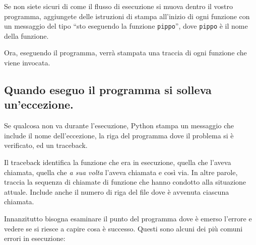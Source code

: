 \documentclass[10pt]{book}
\begin{document}
Se non siete sicuri di come il flusso di esecuzione si muova dentro il vostro programma, aggiungete delle istruzioni di stampa all'inizio di ogni funzione con un messaggio del tipo ``sto eseguendo la funzione {\tt pippo}'', dove
{\tt pippo} è il nome della funzione.

Ora, eseguendo il programma, verrà stampata una traccia di ogni funzione che viene invocata.


\subsection{Quando eseguo il programma si solleva un'eccezione.}

Se qualcosa non va durante l'esecuzione, Python stampa un messaggio che include il nome dell'eccezione, la riga del programma dove il problema si è verificato, ed un traceback.

Il traceback identifica la funzione che era in esecuzione, quella che l'aveva chiamata, quella che {\em a sua volta} l'aveva chiamata e così via. In altre parole, traccia la sequenza di chiamate di funzione che hanno condotto alla situazione attuale. Include anche il numero di riga del file dove è avvenuta ciascuna chiamata.

Innanzitutto bisogna esaminare il punto del programma dove è emerso l'errore e vedere se si riesce a capire cosa è successo. Questi sono alcuni dei più comuni errori in esecuzione:
\end{document}
